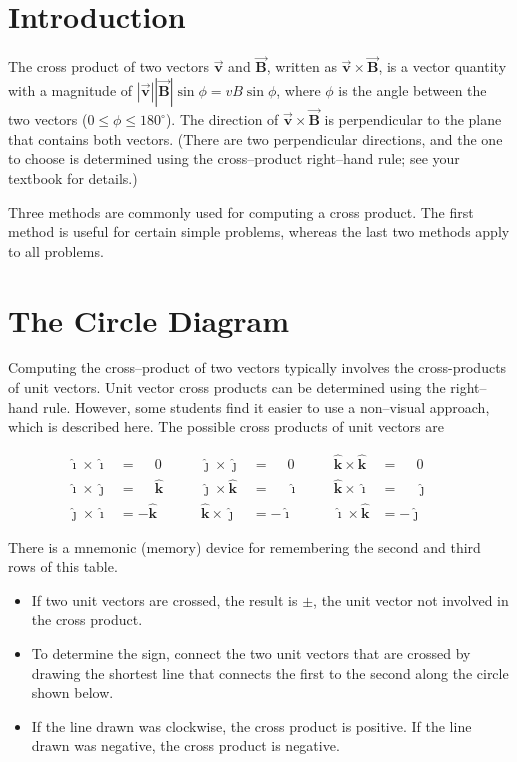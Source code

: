 \documentclass{article}
\newcommand{\ihat}[0]{\hat{\boldsymbol{\imath}}}
\newcommand{\jhat}[0]{\hat{\boldsymbol{\jmath}}}
\newcommand{\khat}[0]{\hat{\boldsymbol{k}}}
\newcommand{\bfvec}[1]{\vec{\mathbf{#1}}}
\begin{document}
\section{Introduction}

The cross product of two vectors $\bfvec{v}$ and $\bfvec{B}$, written as $\bfvec{v}\times\bfvec{B}$, is a vector quantity with a magnitude of $|\bfvec{v}||\bfvec{B}|\sin\phi = vB\sin\phi$, where $\phi$ is the angle between the two vectors ($0 \le\phi \le 180^{\circ}$). The direction of $\bfvec{v}\times\bfvec{B}$ is perpendicular to the plane that contains both vectors. (There are two perpendicular directions, and the one to choose is determined using the cross--product right--hand rule; see your textbook for details.)

Three methods are commonly used for computing a cross product. The first method is useful for certain simple problems, whereas the last two methods apply to all problems.

\section{The Circle Diagram}

Computing the cross--product of two vectors typically involves the cross-products of unit vectors. Unit vector cross products can be determined using the right--hand rule. However, some students find it easier to use a non--visual approach, which is described here. The possible cross products of unit vectors are

$$
\begin{align*}
\ihat\times\ihat & = \phantom{-}0 \qquad &
\jhat\times\jhat & = \phantom{-}0 \qquad &
\khat\times\khat & = \phantom{-}0 \qquad
\\
\ihat\times\jhat & =  \phantom{-}\khat &
\jhat\times\khat & = \phantom{-}\ihat  &
\khat\times\ihat & = \phantom{-}\jhat
\\
\jhat\times\ihat & = -\khat &
\khat\times\jhat & = -\ihat &
\ihat\times\khat & = -\jhat
\end{align*}
$$

There is a mnemonic (memory) device for remembering the second and third rows of this table.

\begin{itemize}

  \item If two unit vectors are crossed, the result is $\pm$, the unit vector not involved in the cross product.

  \item To determine the sign, connect the two unit vectors that are crossed by drawing the shortest line that connects the first to the second along the circle shown below.

  \item If the line drawn was clockwise, the cross product is positive. If the line drawn was negative, the cross product is negative.

\end{itemize}
\end{document}
